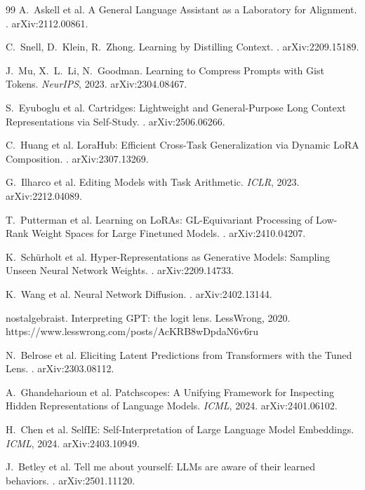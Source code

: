 \documentclass[11pt]{article}
\begin{document}
\begin{thebibliography}{99}
 A.~Askell et al.
\newblock A General Language Assistant as a Laboratory for Alignment.
. arXiv:2112.00861.

 C.~Snell, D.~Klein, R.~Zhong.
\newblock Learning by Distilling Context.
. arXiv:2209.15189.

 J.~Mu, X.~L.~Li, N.~Goodman.
\newblock Learning to Compress Prompts with Gist Tokens.
\newblock \emph{NeurIPS}, 2023. arXiv:2304.08467.

 S.~Eyuboglu et al.
\newblock Cartridges: Lightweight and General-Purpose Long Context Representations via Self-Study.
. arXiv:2506.06266.

 C.~Huang et al.
\newblock LoraHub: Efficient Cross-Task Generalization via Dynamic LoRA Composition.
. arXiv:2307.13269.

 G.~Ilharco et al.
\newblock Editing Models with Task Arithmetic.
\newblock \emph{ICLR}, 2023. arXiv:2212.04089.

 T.~Putterman et al.
\newblock Learning on LoRAs: GL-Equivariant Processing of Low-Rank Weight Spaces for Large Finetuned Models.
. arXiv:2410.04207.

 K.~Sch\"urholt et al.
\newblock Hyper-Representations as Generative Models: Sampling Unseen Neural Network Weights.
. arXiv:2209.14733.

 K.~Wang et al.
\newblock Neural Network Diffusion.
. arXiv:2402.13144.

 nostalgebraist.
\newblock Interpreting GPT: the logit lens.
\newblock LessWrong, 2020. https://www.lesswrong.com/posts/AcKRB8wDpdaN6v6ru

 N.~Belrose et al.
\newblock Eliciting Latent Predictions from Transformers with the Tuned Lens.
. arXiv:2303.08112.

 A.~Ghandeharioun et al.
\newblock Patchscopes: A Unifying Framework for Inspecting Hidden Representations of Language Models.
\newblock \emph{ICML}, 2024. arXiv:2401.06102.

 H.~Chen et al.
\newblock SelfIE: Self-Interpretation of Large Language Model Embeddings.
\newblock \emph{ICML}, 2024. arXiv:2403.10949.

 J.~Betley et al.
\newblock Tell me about yourself: LLMs are aware of their learned behaviors.
. arXiv:2501.11120.


\end{thebibliography}
\end{document}
